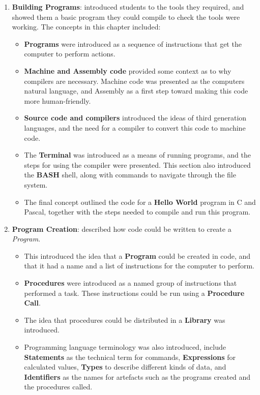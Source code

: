 \begin{enumerate}
  \item \textbf{Building Programs}: introduced students to the tools they required, and showed them a basic program they could compile to check the tools were working. The concepts in this chapter included: 
  \begin{itemize}[noitemsep,nolistsep]
    \item \textbf{Programs} were introduced as a sequence of instructions that get the computer to perform actions.
    \item \textbf{Machine and Assembly code} provided some context as to why compilers are necessary. Machine code was presented as the computers natural language, and Assembly as a first step toward making this code more human-friendly.
    \item \textbf{Source code and compilers} introduced the ideas of third generation languages, and the need for a compiler to convert this code to machine code.
    \item The \textbf{Terminal} was introduced as a means of running programs, and the steps for using the compiler were presented. This section also introduced the \textbf{BASH} shell, along with commands to navigate through the file system. 
    \item The final concept outlined the code for a \textbf{Hello World} program in C and Pascal, together with the steps needed to compile and run this program. 
  \end{itemize}
  \item \textbf{Program Creation}: described how code could be written to create a \emph{Program}.
  \begin{itemize}[noitemsep,nolistsep]
    \item This introduced the idea that a \textbf{Program} could be created in code, and that it had a name and a list of instructions for the computer to perform.
    \item \textbf{Procedures} were introduced as a named group of instructions that performed a task. These instructions could be run using a \textbf{Procedure Call}.
    \item The idea that procedures could be distributed in a \textbf{Library} was introduced.
    \item Programming language terminology was also introduced, include \textbf{Statements} as the technical term for commands, \textbf{Expressions} for calculated values, \textbf{Types} to describe different kinds of data, and \textbf{Identifiers} as the names for artefacts such as the programs created and the procedures called. 

\end{itemize}
\end{enumerate}
